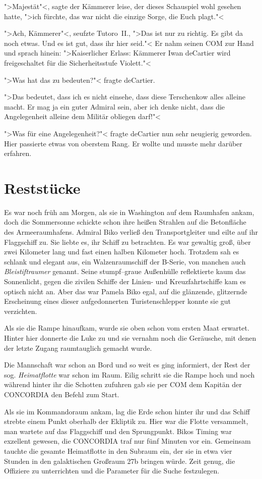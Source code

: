 \documentclass[11pt,twoside,openany]{scrbook}
\begin{document}
">Majestät"<, sagte der Kämmerer leise, der dieses Schauspiel wohl gesehen hatte, ">ich fürchte, das war nicht die einzige Sorge, die Euch plagt."<

">Ach, Kämmerer"<, seufzte Tutoro~II., ">Das ist nur zu richtig. Es gibt da noch etwas. Und es ist gut, dass ihr hier seid."< Er nahm seinen COM zur Hand und sprach hinein: ">Kaiserlicher Erlass: Kämmerer Iwan deCartier wird freigeschaltet für die Sicherheitsstufe Violett."<

">Was hat das zu bedeuten?"< fragte deCartier.

">Das bedeutet, dass ich es nicht einsehe, dass diese Terschenkow alles alleine macht. Er mag ja ein guter Admiral sein, aber ich denke nicht, dass die Angelegenheit alleine dem Militär obliegen darf!"<

">Was für eine Angelegenheit?"< fragte deCartier nun sehr neugierig geworden. Hier passierte etwas von oberstem Rang. Er wollte und musste mehr darüber erfahren.

\chapter*{Reststücke}

Es war noch früh am Morgen, als sie in Washington auf dem Raumhafen ankam, doch die Sommersonne schickte schon ihre heißen Strahlen auf die Betonfläche des Armeeraumhafens. Admiral Biko verließ den Transportgleiter und eilte auf ihr Flaggschiff zu. Sie liebte es, ihr Schiff zu betrachten. Es war gewaltig groß, über zwei Kilometer lang und fast einen halben Kilometer hoch. Trotzdem sah es schlank und elegant aus, ein Walzenraumschiff der \textsf{B-}Serie, von manchen auch \emph{Bleistiftraumer} genannt. Seine stumpf--graue Außenhülle reflektierte kaum das Sonnenlicht, gegen die zivilen Schiffe der Linien- und Kreuzfahrtschiffe kam es optisch nicht an. Aber das war Pamela Biko egal, auf die glänzende, glitzernde Erscheinung eines dieser aufgedonnerten Turistenschlepper konnte sie gut verzichten.

Als sie die Rampe hinaufkam, wurde sie oben schon vom ersten Maat erwartet. Hinter hier donnerte die Luke zu und sie vernahm noch die Geräusche, mit denen der letzte Zugang raumtauglich gemacht wurde. 

Die Mannschaft war schon an Bord und so weit es ging informiert, der Rest der sog. \emph{Heimatflotte} war schon im Raum. Eilig schritt sie die Rampe hoch und noch während hinter ihr die Schotten zufuhren gab sie per COM dem Kapitän der \textsf{CONCORDIA} den Befehl zum Start.

Als sie im Kommandoraum ankam, lag die Erde schon hinter ihr und das Schiff strebte einem Punkt oberhalb der Ekliptik zu. Hier war die Flotte versammelt, man wartete auf das Flaggschiff und den Sprungpunkt. Bikos Timing war exzellent gewesen, die \textsf{CONCORDIA} traf nur fünf Minuten vor ein. Gemeinsam tauchte die gesamte Heimatflotte in den Subraum ein, der sie in etwa vier Stunden in den galaktischen Großraum \textsf{27b} bringen würde. Zeit genug, die Offiziere zu unterrichten und die Parameter für die Suche festzulegen.
\end{document}
